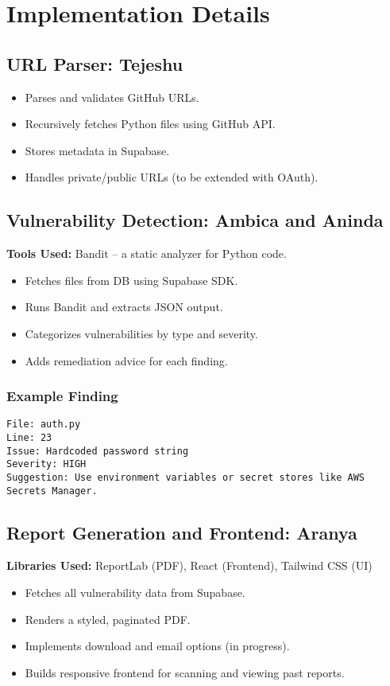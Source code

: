 \documentclass{article}
\begin{document}
\section{Implementation Details}
\subsection{URL Parser: Tejeshu}
\begin{itemize}
    \item Parses and validates GitHub URLs.
    \item Recursively fetches Python files using GitHub API.
    \item Stores metadata in Supabase.
    \item Handles private/public URLs (to be extended with OAuth).
\end{itemize}

\subsection{Vulnerability Detection: Ambica and Aninda}
\textbf{Tools Used:} Bandit – a static analyzer for Python code.
\begin{itemize}
    \item Fetches files from DB using Supabase SDK.
    \item Runs Bandit and extracts JSON output.
    \item Categorizes vulnerabilities by type and severity.
    \item Adds remediation advice for each finding.
\end{itemize}

\subsubsection{Example Finding}
\begin{verbatim}
File: auth.py
Line: 23
Issue: Hardcoded password string
Severity: HIGH
Suggestion: Use environment variables or secret stores like AWS Secrets Manager.
\end{verbatim}

\subsection{Report Generation and Frontend: Aranya}
\textbf{Libraries Used:} ReportLab (PDF), React (Frontend), Tailwind CSS (UI)
\begin{itemize}
    \item Fetches all vulnerability data from Supabase.
    \item Renders a styled, paginated PDF.
    \item Implements download and email options (in progress).
    \item Builds responsive frontend for scanning and viewing past reports.
\end{itemize}
\end{document}
